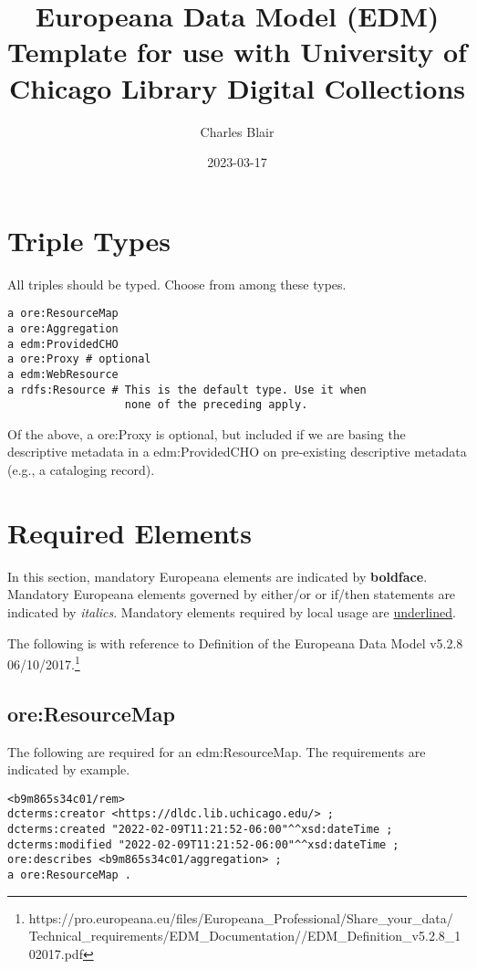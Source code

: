 \documentclass[11pt]{article}
\date{2023-03-17}
\title{Europeana Data Model (EDM) Template for use with University of Chicago Library Digital Collections}
\author{Charles Blair}
\begin{document}
\maketitle

\section{Triple Types}
All triples should be typed. Choose from among these types.

\begin{lstlisting}
a ore:ResourceMap
a ore:Aggregation
a edm:ProvidedCHO
a ore:Proxy # optional
a edm:WebResource
a rdfs:Resource # This is the default type. Use it when
                  none of the preceding apply.
\end{lstlisting}

Of the above, a ore:Proxy is optional, but included if we are basing the descriptive metadata in a edm:ProvidedCHO on pre-existing descriptive metadata (e.g., a cataloging record).

\section{Required Elements}
In this section, mandatory Europeana elements are indicated by \textbf{boldface}. Mandatory Europeana elements governed by either/or or if/then statements are indicated by \textit{italics}. Mandatory elements required by local usage are \underline{underlined}.

The following is with reference to Definition of the Europeana Data Model v5.2.8 06/10/2017.\footnote{https://pro.europeana.eu/files/Europeana\_Professional/Share\_your\_data/
Technical\_requirements/EDM\_Documentation//EDM\_Definition\_v5.2.8\_102017.pdf}

\subsection{ore:ResourceMap}

The following are required for an edm:ResourceMap. The requirements are indicated by example.

\begin{verbatim}
<b9m865s34c01/rem>
dcterms:creator <https://dldc.lib.uchicago.edu/> ;
dcterms:created "2022-02-09T11:21:52-06:00"^^xsd:dateTime ;
dcterms:modified "2022-02-09T11:21:52-06:00"^^xsd:dateTime ;
ore:describes <b9m865s34c01/aggregation> ;
a ore:ResourceMap .
\end{verbatim}
\end{document}
